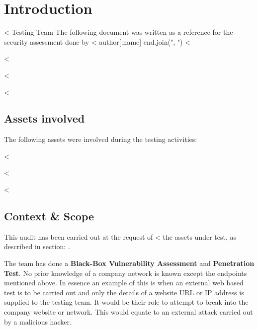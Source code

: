 

\chapter{Introduction}\label{ch:introduction}

  <%
         Testing Team %
  The following document was written as a reference for the security
  assessment done by <%
    author[:name]
  end.join(", ") %
  <%

  <%

    <%

  <%
  \section{Assets involved}\label{sec:assets}

    The following assets were involved during the testing activities:

    \begin{itemize}
      <%
        <%
          \item \textbf{<%
        <%
          \item \textbf{<%
        <%
      <%
    \end{itemize}

  <%

    <%

  <%
  \section{Context \& Scope}\label{sec:scope}

    This audit has been carried out at the request of
    <%
    the assets under test, as described in section: .

    The team has done a \textbf{Black-Box Vulnerability Assessment} and
    \textbf{Penetration Test}.
    No prior knowledge of a company network is known except the endpoints
    mentioned above.
    In essence an example of this is when an external web based test is to be
    carried out and only the details of a website URL or IP address is supplied
    to the testing team.
    It would be their role to attempt to break into the company website or
    network.
    This would equate to an external attack carried out by a malicious hacker.

